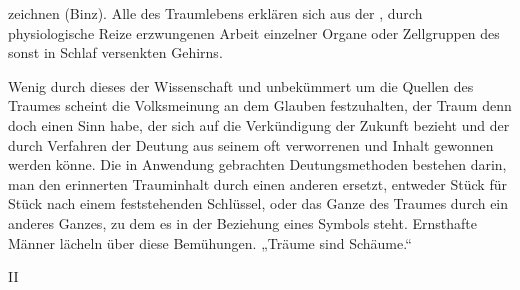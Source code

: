 \documentclass{article}
\begin{document}
         
            
            
            
        \pstart
        zeichnen (Binz). Alle 
     des Traumlebens erklären sich aus der 
    , durch physiologische Reize erzwungenen Arbeit einzelner Organe oder
               Zellgruppen des sonst in Schlaf versenkten Gehirns.
        \pend
    
            
        \pstart
        Wenig 
     durch dieses 
     der Wissenschaft und unbekümmert um die Quellen des Traumes 
     scheint die Volksmeinung an dem Glauben festzuhalten, 
     der Traum denn doch einen Sinn habe, der sich auf die Verkündigung der
               Zukunft bezieht 
     und der durch 
     Verfahren der Deutung aus seinem oft verworrenen und 
     Inhalt gewonnen werden könne. Die in Anwendung gebrachten
               Deutungsmethoden bestehen darin, 
     man den erinnerten Trauminhalt durch einen anderen ersetzt, entweder
               Stück für Stück nach einem feststehenden
                  Schlüssel, oder das Ganze des Traumes durch ein anderes Ganzes, zu dem
               es in der Beziehung eines Symbols steht.
               Ernsthafte Männer lächeln über diese Bemühungen. „Träume sind Schäume.“
        \pend
    
         
            
            
            
        \pstart
        II
        \pend
    
\end{document}
